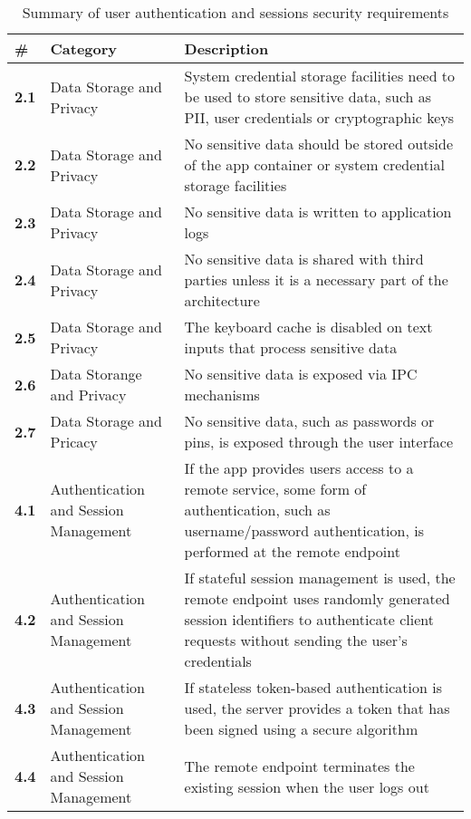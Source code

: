 \begin{table}[!h]
    \centering
    \caption{Summary of user authentication and sessions security requirements}
    \label{tab:auth-and-session-summary-requirements}
    \begin{tabulary}{1.0\textwidth}{|l|L|L|}
        \hline
        \textbf{\#} & \textbf{Category} & \textbf{Description} \\
        \hline
        \textbf{2.1} & Data Storage and Privacy & System credential storage facilities need to be used to store sensitive data, such as PII, user credentials or cryptographic keys \\
        \hline
        \textbf{2.2} & Data Storage and Privacy & No sensitive data should be stored outside of the app container or system credential storage facilities \\
        \hline
        \textbf{2.3} & Data Storage and Privacy & No sensitive data is written to application logs\\
        \hline
        \textbf{2.4} & Data Storage and Privacy & No sensitive data is shared with third parties unless it is a necessary part of the architecture \\
        \hline
        \textbf{2.5} & Data Storage and Privacy & The keyboard cache is disabled on text inputs that process sensitive data \\
        \hline
        \textbf{2.6} & Data Storange and Privacy & No sensitive data is exposed via IPC mechanisms \\
        \hline
        \textbf{2.7} & Data Storage and Pricacy &  No sensitive data, such as passwords or pins, is exposed through the user interface \\
        \hline 
        \textbf{4.1} & Authentication and Session Management & If the app provides users access to a remote service, some form of authentication, such as username/password authentication, is performed at the remote endpoint \\
        \hline
        \textbf{4.2} & Authentication and Session Management & If stateful session management is used, the remote endpoint uses randomly generated session identifiers to authenticate client requests without sending the user's credentials\\
        \hline
        \textbf{4.3} & Authentication and Session Management & If stateless token-based authentication is used, the server provides a token that has been signed using a secure algorithm \\
        \hline
        \textbf{4.4} & Authentication and Session Management & The remote endpoint terminates the existing session when the user logs out \\

\end{tabulary}
\end{table}
